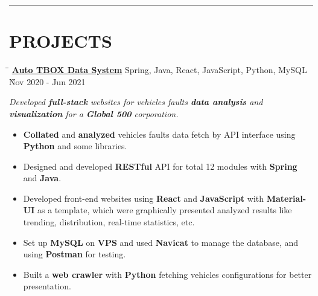 \documentclass{res}
\begin{document}
\begin{resume}
\vspace{+0.05in}

\vspace{-12pt}
\hspace{-0.55in}
\noindent\rule[0.25\baselineskip]{19.36cm}{0.5pt}    
        
\vspace{-0.2in}
\section{PROJECTS}

    \vspace{-0.05in}	 
    \begin{tabbing}
    \hspace{2.391in}\= \hspace{3in}\= \kill %
    \href{https://github.com/DolorHunter/AutoTBOXDataSystem}{\bf Auto TBOX Data System}  \> 
                Spring, Java, React, JavaScript, Python, MySQL \` Nov 2020 - Jun 2021 \\
    \end{tabbing}\vspace{-20pt}      %
    \vspace{-0.13in}
    \textit{Developed {\bf full-stack} websites for vehicles faults {\bf data analysis} and
             {\bf visualization} for a {\bf Global 500} corporation.}
    \vspace{-0.1in}
    \begin{itemize} \itemsep 0.5pt %
        \item {\bf Collated} and {\bf analyzed} vehicles faults data fetch by API interface using 
                {\bf Python} and some libraries.
        \item Designed and developed {\bf RESTful} API for total 12 modules with 
                {\bf Spring} and {\bf Java}.
        \item Developed front-end websites using {\bf React} and {\bf JavaScript} with 
                {\bf Material-UI} as a template, which were graphically presented analyzed results 
                like trending, distribution, real-time statistics, etc.
        \item Set up {\bf MySQL} on {\bf VPS} and used {\bf Navicat} to manage the database, and 
                using {\bf Postman} for testing.
        \item Built a {\bf web crawler} with {\bf Python} fetching vehicles configurations for 
                better presentation.
    \end{itemize}


\end{resume}
\end{document}
